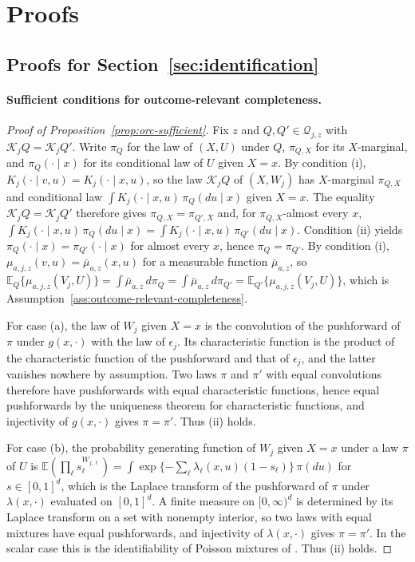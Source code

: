 \section{Proofs}
\label{app:proofs}

\subsection{Proofs for Section~\ref{sec:identification}}

\paragraph{Sufficient conditions for outcome-relevant completeness.}
\begin{proof}[Proof of Proposition~\ref{prop:orc-sufficient}]
Fix $z$ and $Q,Q'\in\mathcal Q_{j,z}$ with $\mathcal K_jQ=\mathcal K_jQ'$. Write $\pi_Q$ for the law of $(X,U)$ under $Q$, $\pi_{Q,X}$ for its $X$-marginal, and $\pi_Q(\cdot\mid x)$ for its conditional law of $U$ given $X=x$. By condition (i), $K_j(\cdot\mid v,u)=K_j(\cdot\mid x,u)$, so the law $\mathcal K_jQ$ of $(X,W_j)$ has $X$-marginal $\pi_{Q,X}$ and conditional law $\int K_j(\cdot\mid x,u)\,\pi_Q(du\mid x)$ given $X=x$. The equality $\mathcal K_jQ=\mathcal K_jQ'$ therefore gives $\pi_{Q,X}=\pi_{Q',X}$ and, for $\pi_{Q,X}$-almost every $x$, $\int K_j(\cdot\mid x,u)\,\pi_Q(du\mid x)=\int K_j(\cdot\mid x,u)\,\pi_{Q'}(du\mid x)$. Condition (ii) yields $\pi_Q(\cdot\mid x)=\pi_{Q'}(\cdot\mid x)$ for almost every $x$, hence $\pi_Q=\pi_{Q'}$. By condition (i), $\mu_{a,j,z}(v,u)=\bar\mu_{a,z}(x,u)$ for a measurable function $\bar\mu_{a,z}$, so $\mathbb E_Q\{\mu_{a,j,z}(V_j,U)\}=\int\bar\mu_{a,z}\,d\pi_Q=\int\bar\mu_{a,z}\,d\pi_{Q'}=\mathbb E_{Q'}\{\mu_{a,j,z}(V_j,U)\}$, which is Assumption~\ref{ass:outcome-relevant-completeness}.

For case (a), the law of $W_j$ given $X=x$ is the convolution of the pushforward of $\pi$ under $g(x,\cdot)$ with the law of $\epsilon_j$. Its characteristic function is the product of the characteristic function of the pushforward and that of $\epsilon_j$, and the latter vanishes nowhere by assumption. Two laws $\pi$ and $\pi'$ with equal convolutions therefore have pushforwards with equal characteristic functions, hence equal pushforwards by the uniqueness theorem for characteristic functions, and injectivity of $g(x,\cdot)$ gives $\pi=\pi'$. Thus (ii) holds.

For case (b), the probability generating function of $W_j$ given $X=x$ under a law $\pi$ of $U$ is $\mathbb E(\prod_\ell s_\ell^{W_{j,\ell}})=\int\exp\{-\sum_\ell\lambda_\ell(x,u)(1-s_\ell)\}\,\pi(du)$ for $s\in[0,1]^{d}$, which is the Laplace transform of the pushforward of $\pi$ under $\lambda(x,\cdot)$ evaluated on $[0,1]^{d}$. A finite measure on $[0,\infty)^{d}$ is determined by its Laplace transform on a set with nonempty interior, so two laws with equal mixtures have equal pushforwards, and injectivity of $\lambda(x,\cdot)$ gives $\pi=\pi'$. In the scalar case this is the identifiability of Poisson mixtures of \citet{teicher1961identifiability}. Thus (ii) holds.

\end{proof}

